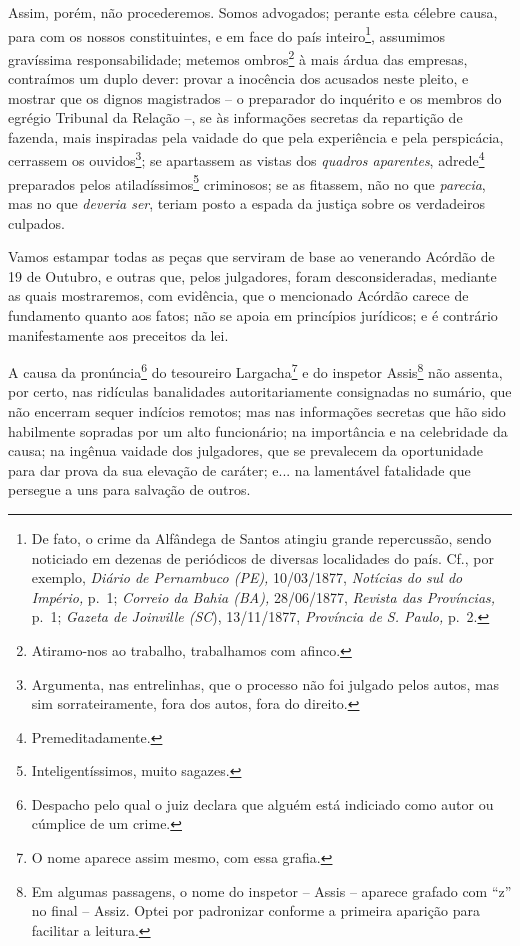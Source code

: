 Assim, porém, não procederemos. Somos advogados; perante esta célebre
causa, para com os nossos constituintes, e em face do país
inteiro\footnote{De fato, o crime da Alfândega de Santos atingiu grande
  repercussão, sendo noticiado em dezenas de periódicos de diversas
  localidades do país. Cf., por exemplo, \emph{Diário de Pernambuco
  (PE),} 10/03/1877, \emph{Notícias do sul do Império,} p.~1;
  \emph{Correio da Bahia (BA),} 28/06/1877, \emph{Revista das
  Províncias,} p.~1; \emph{Gazeta de Joinville (SC}), 13/11/1877,
  \emph{Província de S. Paulo,} p.~2.}, assumimos gravíssima
responsabilidade; metemos ombros\footnote{Atiramo-nos ao trabalho,
  trabalhamos com afinco.} à mais árdua das empresas, contraímos um
duplo dever: provar a inocência dos acusados neste pleito, e mostrar que
os dignos magistrados -- o preparador do inquérito e os membros do
egrégio Tribunal da Relação --, se às informações secretas da repartição
de fazenda, mais inspiradas pela vaidade do que pela experiência e pela
perspicácia, cerrassem os ouvidos\footnote{Argumenta, nas entrelinhas,
  que o processo não foi julgado pelos autos, mas sim sorrateiramente,
  fora dos autos, fora do direito.}; se apartassem as vistas dos
\emph{quadros aparentes}, adrede\footnote{Premeditadamente.} preparados
pelos atiladíssimos\footnote{Inteligentíssimos, muito sagazes.}
criminosos; se as fitassem, não no que \emph{parecia}, mas no que
\emph{deveria ser}, teriam posto a espada da justiça sobre os
verdadeiros culpados.

Vamos estampar todas as peças que serviram de base ao venerando Acórdão
de 19 de Outubro, e outras que, pelos julgadores, foram desconsideradas,
mediante as quais mostraremos, com evidência, que o mencionado Acórdão
carece de fundamento quanto aos fatos; não se apoia em princípios
jurídicos; e é contrário manifestamente aos preceitos da lei.

A causa da pronúncia\footnote{Despacho pelo qual o juiz declara que
  alguém está indiciado como autor ou cúmplice de um crime.} do
tesoureiro Largacha\footnote{O nome aparece assim mesmo, com essa
  grafia.} e do inspetor Assis\footnote{Em algumas passagens, o nome do
  inspetor -- Assis -- aparece grafado com ``z'' no final -- Assiz.
  Optei por padronizar conforme a primeira aparição para facilitar a
  leitura.} não assenta, por certo, nas ridículas banalidades
autoritariamente consignadas no sumário, que não encerram sequer
indícios remotos; mas nas informações secretas que hão sido habilmente
sopradas por um alto funcionário; na importância e na celebridade da
causa; na ingênua vaidade dos julgadores, que se prevalecem da
oportunidade para dar prova da sua elevação de caráter; e... na
lamentável fatalidade que persegue a uns para salvação de outros.

